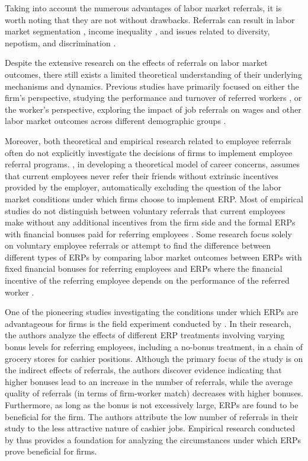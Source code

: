 \documentclass[12pt]{article}
\begin{document}
Taking into account the numerous advantages of labor market referrals, it is worth noting that they are not without drawbacks. Referrals can result in labor market segmentation \citep{kugler2003employee}, income inequality \citep{calvo2004effects}, and issues related to diversity, nepotism, and discrimination \citep{pallais2016referential}.

Despite the extensive research on the effects of referrals on labor market outcomes, there still exists a limited theoretical understanding of their underlying mechanisms and dynamics. Previous studies have primarily focused on either the firm's perspective, studying the performance and turnover of referred workers \citep{beaman2012gets, burks2015value, ekinci2016employee, brown2016informal}, or the worker's perspective, exploring the impact of job referrals on wages and other labor market outcomes across different demographic groups \citep{elliott1999social, dustmann2016referral, heath2018firms}.

Moreover, both theoretical and empirical research related to employee referrals often do not explicitly investigate the decisions of firms to implement employee referral programs. \cite{ekinci2016employee}, in developing a theoretical model of career concerns, assumes that current employees never refer their friends without extrinsic incentives provided by the employer, automatically excluding the question of the labor market conditions under which firms choose to implement ERP. Most of empirical studies do not distinguish between voluntary referrals that current employees make without any additional incentives from the firm side and the formal ERPs with financial bonuses paid for referring employees \citep{burks2015value, brown2016informal}. Some research focus solely on voluntary employee referrals \citep{pallais2016referential} or attempt to find the difference between different types of ERPs by comparing labor market outcomes between ERPs with fixed financial bonuses for referring employees and ERPs where the financial incentive of the referring employee depends on the performance of the referred worker \citep{beaman2012gets}.

One of the pioneering studies investigating the conditions under which ERPs are advantageous for firms is the field experiment conducted by \cite{friebel2023employee}. In their research, the authors analyze the effects of different ERP treatments involving varying bonus levels for referring employees, including a no-bonus treatment, in a chain of grocery stores for cashier positions. Although the primary focus of the study is on the indirect effects of referrals, the authors discover evidence indicating that higher bonuses lead to an increase in the number of referrals, while the average quality of referrals (in terms of firm-worker match) decreases with higher bonuses. Furthermore, as long as the bonus is not excessively large, ERPs are found to be beneficial for the firm. The authors attribute the low number of referrals in their study to the less attractive nature of cashier jobs. Empirical research conducted by \cite{friebel2023employee} thus provides a foundation for analyzing the circumstances under which ERPs prove beneficial for firms.
\end{document}
